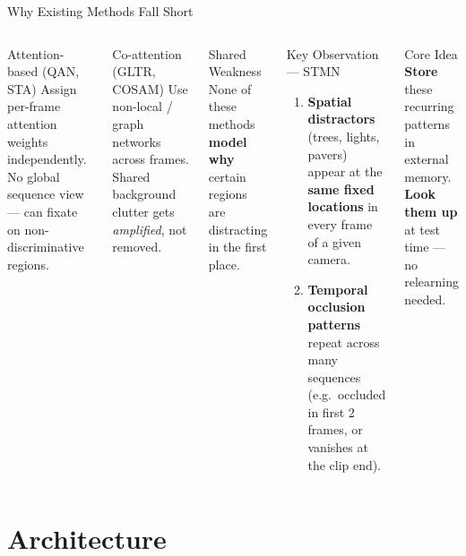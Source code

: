 \documentclass[aspectratio=169]{beamer}
\newcommand{\bt}[1]{\textbf{#1}}
\begin{document}
\begin{frame}{Why Existing Methods Fall Short}
  \begin{columns}[T]
      \begin{block}{Attention-based (QAN, STA)}
        \footnotesize Assign per-frame attention weights independently. No global sequence view --- can fixate on non-discriminative regions.
      \end{block}
      \vspace{0.2em}
      \begin{block}{Co-attention (GLTR, COSAM)}
        \footnotesize Use non-local / graph networks across frames. Shared background clutter gets \emph{amplified}, not removed.
      \end{block}
      \vspace{0.2em}
      \begin{alertblock}{Shared Weakness}
        \footnotesize None of these methods \bt{model why} certain regions are distracting in the first place.
      \end{alertblock}

      \begin{exampleblock}{Key Observation --- STMN}
        \footnotesize
        \begin{enumerate}\setlength\itemsep{2pt}
          \item \bt{Spatial distractors} (trees, lights, pavers) appear at the \bt{same fixed locations} in every frame of a given camera.
          \item \bt{Temporal occlusion patterns} repeat across many sequences (e.g.\ occluded in first 2 frames, or vanishes at the clip end).
        \end{enumerate}
      \end{exampleblock}
      \vspace{0.2em}
      \begin{alertblock}{Core Idea}
        \footnotesize \bt{Store} these recurring patterns in external memory.\\ \bt{Look them up} at test time --- no relearning needed.
      \end{alertblock}
  \end{columns}
\end{frame}

\section{Architecture}
\end{document}
